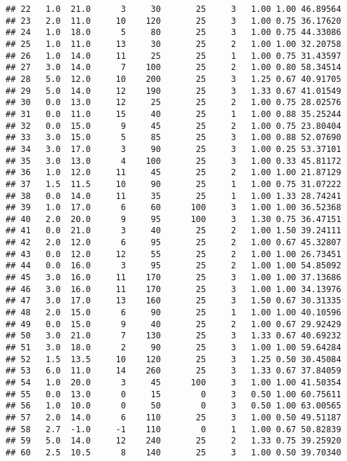 \documentclass[
]{article}
\begin{document}
\begin{verbatim}
## 22   1.0  21.0      3     30       25     3   1.00 1.00 46.89564
## 23   2.0  11.0     10    120       25     3   1.00 0.75 36.17620
## 24   1.0  18.0      5     80       25     3   1.00 0.75 44.33086
## 25   1.0  11.0     13     30       25     2   1.00 1.00 32.20758
## 26   1.0  14.0     11     25       25     1   1.00 0.75 31.43597
## 27   3.0  14.0      7    100       25     2   1.00 0.80 58.34514
## 28   5.0  12.0     10    200       25     3   1.25 0.67 40.91705
## 29   5.0  14.0     12    190       25     3   1.33 0.67 41.01549
## 30   0.0  13.0     12     25       25     2   1.00 0.75 28.02576
## 31   0.0  11.0     15     40       25     1   1.00 0.88 35.25244
## 32   0.0  15.0      9     45       25     2   1.00 0.75 23.80404
## 33   3.0  15.0      5     85       25     3   1.00 0.88 52.07690
## 34   3.0  17.0      3     90       25     3   1.00 0.25 53.37101
## 35   3.0  13.0      4    100       25     3   1.00 0.33 45.81172
## 36   1.0  12.0     11     45       25     2   1.00 1.00 21.87129
## 37   1.5  11.5     10     90       25     1   1.00 0.75 31.07222
## 38   0.0  14.0     11     35       25     1   1.00 1.33 28.74241
## 39   1.0  17.0      6     60      100     3   1.00 1.00 36.52368
## 40   2.0  20.0      9     95      100     3   1.30 0.75 36.47151
## 41   0.0  21.0      3     40       25     2   1.00 1.50 39.24111
## 42   2.0  12.0      6     95       25     2   1.00 0.67 45.32807
## 43   0.0  12.0     12     55       25     2   1.00 1.00 26.73451
## 44   0.0  16.0      3     95       25     2   1.00 1.00 54.85092
## 45   3.0  16.0     11    170       25     3   1.00 1.00 37.13686
## 46   3.0  16.0     11    170       25     3   1.00 1.00 34.13976
## 47   3.0  17.0     13    160       25     3   1.50 0.67 30.31335
## 48   2.0  15.0      6     90       25     1   1.00 1.00 40.10596
## 49   0.0  15.0      9     40       25     2   1.00 0.67 29.92429
## 50   3.0  21.0      7    130       25     3   1.33 0.67 40.69232
## 51   3.0  18.0      2     90       25     3   1.00 1.00 59.64284
## 52   1.5  13.5     10    120       25     3   1.25 0.50 30.45084
## 53   6.0  11.0     14    260       25     3   1.33 0.67 37.84059
## 54   1.0  20.0      3     45      100     3   1.00 1.00 41.50354
## 55   0.0  13.0      0     15        0     3   0.50 1.00 60.75611
## 56   1.0  10.0      0     50        0     3   0.50 1.00 63.00565
## 57   2.0  14.0      6    110       25     3   1.00 0.50 49.51187
## 58   2.7  -1.0     -1    110        0     1   1.00 0.67 50.82839
## 59   5.0  14.0     12    240       25     2   1.33 0.75 39.25920
## 60   2.5  10.5      8    140       25     3   1.00 0.50 39.70340

\end{verbatim}
\end{document}
